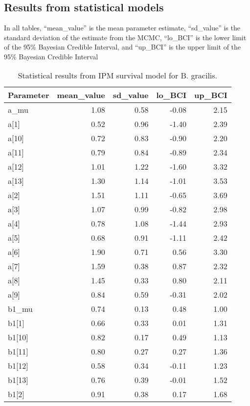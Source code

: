 \documentclass[12pt,]{article}
\begin{document}
\subsection{Results from statistical
models}\label{results-from-statistical-models}

In all tables, ``mean\_value'' is the mean parameter estimate,
``sd\_value'' is the standard deviation of the estimate from the MCMC,
``lo\_BCI'' is the lower limit of the 95\% Bayesian Credible Interval,
and ``up\_BCI'' is the upper limit of the 95\% Bayesian Credible
Interval

\begin{table}[ht]
\centering
\caption{Statistical results from IPM survival model for B. gracilis.} 
{\footnotesize
\begin{tabular}{lrrrr}
  \hline
Parameter & mean\_value & sd\_value & lo\_BCI & up\_BCI \\ 
  \hline
a\_mu & 1.08 & 0.58 & -0.08 & 2.15 \\ 
  a[1] & 0.52 & 0.96 & -1.40 & 2.39 \\ 
  a[10] & 0.72 & 0.83 & -0.90 & 2.20 \\ 
  a[11] & 0.79 & 0.84 & -0.89 & 2.34 \\ 
  a[12] & 1.01 & 1.22 & -1.60 & 3.32 \\ 
  a[13] & 1.30 & 1.14 & -1.01 & 3.53 \\ 
  a[2] & 1.51 & 1.11 & -0.65 & 3.69 \\ 
  a[3] & 1.07 & 0.99 & -0.82 & 2.98 \\ 
  a[4] & 0.78 & 1.08 & -1.44 & 2.93 \\ 
  a[5] & 0.68 & 0.91 & -1.11 & 2.42 \\ 
  a[6] & 1.90 & 0.71 & 0.56 & 3.30 \\ 
  a[7] & 1.59 & 0.38 & 0.87 & 2.32 \\ 
  a[8] & 1.45 & 0.33 & 0.80 & 2.11 \\ 
  a[9] & 0.84 & 0.59 & -0.31 & 2.02 \\ 
  b1\_mu & 0.74 & 0.13 & 0.48 & 1.00 \\ 
  b1[1] & 0.66 & 0.33 & 0.01 & 1.31 \\ 
  b1[10] & 0.82 & 0.17 & 0.49 & 1.13 \\ 
  b1[11] & 0.80 & 0.27 & 0.27 & 1.36 \\ 
  b1[12] & 0.58 & 0.34 & -0.11 & 1.23 \\ 
  b1[13] & 0.76 & 0.39 & -0.01 & 1.52 \\ 
  b1[2] & 0.91 & 0.38 & 0.17 & 1.68 \\ 

\end{tabular}}
\end{table}
\end{document}
